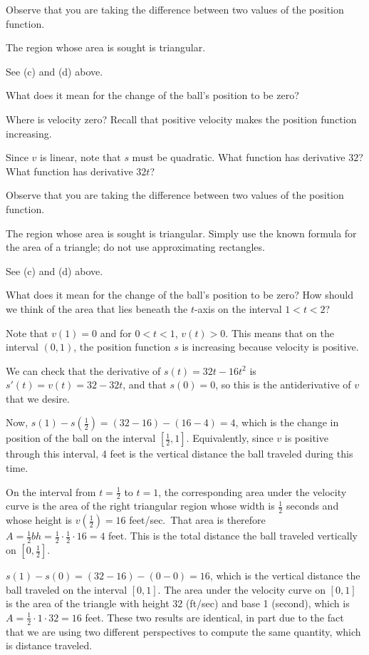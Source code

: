Observe that you are taking the difference between two values of the
position function.

The region whose area is sought is triangular.

See (c) and (d) above.

What does it mean for the change of the ball's position to be zero?

Where is velocity zero? Recall that positive velocity makes the position
function increasing.

Since \(v\) is linear, note that \(s\) must be quadratic. What function
has derivative \(32\)? What function has derivative \(32t\)?

Observe that you are taking the difference between two values of the
position function.

The region whose area is sought is triangular. Simply use the known
formula for the area of a triangle; do not use approximating rectangles.

See (c) and (d) above.

What does it mean for the change of the ball's position to be zero? How
should we think of the area that lies beneath the \(t\)-axis on the
interval \(1 < t < 2\)?

Note that \(v(1) = 0\) and for \(0 < t < 1\), \(v(t) > 0\). This means
that on the interval \((0,1)\), the position function \(s\) is
increasing because velocity is positive.

We can check that the derivative of \(s(t) = 32t - 16t^2\) is
\(s'(t) = v(t) = 32 - 32t\), and that \(s(0) = 0\), so this is the
antiderivative of \(v\) that we desire.

Now, \(s(1) - s(\frac{1}{2}) = (32 - 16) - (16 - 4) = 4\), which is the
change in position of the ball on the interval \([\frac{1}{2},1]\).
Equivalently, since \(v\) is positive through this interval, 4 feet is
the vertical distance the ball traveled during this time.

On the interval from \(t = \frac{1}{2}\) to \(t = 1\), the corresponding
area under the velocity curve is the area of the right triangular region
whose width is \(\frac{1}{2}\) seconds and whose height is
\(v(\frac{1}{2}) = 16\) feet/sec.~That area is therefore
\(A = \frac{1}{2} bh = \frac{1}{2} \cdot \frac{1}{2} \cdot 16 = 4\)
feet. This is the total distance the ball traveled vertically on
\([0,\frac{1}{2}]\).

\(s(1) - s(0) = (32 - 16) - (0-0) = 16\), which is the vertical distance
the ball traveled on the interval \([0,1]\). The area under the velocity
curve on \([0,1]\) is the area of the triangle with height 32 (ft/sec)
and base 1 (second), which is \(A = \frac{1}{2} \cdot 1 \cdot 32 = 16\)
feet. These two results are identical, in part due to the fact that we
are using two different perspectives to compute the same quantity, which
is distance traveled.

